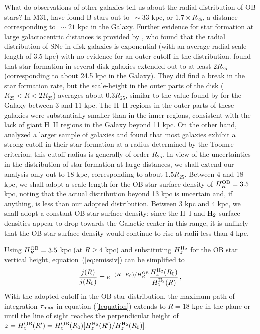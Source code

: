 \documentclass[12pt,preprint,flushrt]{aastex}
\begin{document}
   What do observations of other galaxies tell us about the radial
distribution of OB stars?
In M31, \cite{cuil01} have found B stars out to $\,\sim\! 33$ kpc, or
$1.7\times R_{25}$,
a distance corresponding to $\,\sim\! 21$ kpc in the Galaxy.
Further evidence for star formation at large galactocentric distances
is provided by
\cite{wan97}, who found that the radial distribution of SNe in
disk galaxies is exponential (with an average radial scale length
of 3.5 kpc) with no evidence for an outer cutoff in the distribution.
\cite{ferg98} found that star formation in several disk
galaxies extended out to at least $2R_{25}$ (corresponding to
about 24.5 kpc in the Galaxy).
They did find a break in the star formation rate, but the
scale-height in the outer parts of the disk ($R_{25}<R<2 R_{25}$)
averages about $0.3 R_{25}$, similar to the value found
by \cite{mck97} for the Galaxy between 3 and 11 kpc.
The H~II regions in the outer parts of these galaxies were
substantially smaller than in the inner regions, consistent
with the lack of giant H~II regions in the Galaxy beyond 11 kpc.
On the other hand, \cite{mar01} analyzed a larger sample
of galaxies and found that most galaxies exhibit
a strong cutoff in their star formation at a radius determined
by the Toomre criterion; this cutoff radius is generally of
order $R_{25}$.
In view of the uncertainties in the distribution of star
formation at large distances, we shall extend our analysis
only out to 18 kpc, corresponding to about
$1.5 R_{25}$.  Between 4 and 18 kpc, we shall adopt a scale
length for the OB star surface density of $H_R^{\rm OB} = 3.5$ kpc,
noting that the actual distribution beyond 13 kpc
is uncertain and, if anything, is less than our adopted distribution.
Between 3 kpc and 4 kpc,  we shall adopt a constant OB-star surface
density; since the
H~I and ${\rm H_2}$ surface densities appear to drop towards
the Galactic center in this range, it
is unlikely that the OB star surface density
would continue to rise at radii less than 4 kpc.

Using $H_R^{\rm OB} = 3.5$ kpc (at $R\ge 4$ kpc) and
substituting $H_z^{\rm H_2}$ for
the OB star vertical height, equation~(\ref{eq:emissiv}) can be simplified to
\begin{equation}\label{jeq}
      \frac{j(R)}{j(R_0)} = {e}^{-(R-R_0)/H^{\rm OB}_R}
\frac{H_z^{\rm H_2}(R_0)}{H_z^{\rm H_2}(R)}\, ,
\end{equation}
With the adopted cutoff in the OB star
distribution, the maximum path of integration $\tau_{\rm max}$ in equation
(\ref{Iequation}) extends to
$R = 18$ kpc in the plane or until the line of sight reaches the
perpendicular height of
$z=H_z^{\rm OB}(R') = H_z^{\rm OB}(R_0)[H_z^{\rm H_2}(R')/H_z^{\rm H_2}(R_0)]$.
\end{document}
